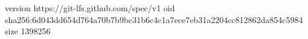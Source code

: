 version https://git-lfs.github.com/spec/v1
oid sha256:6d043dd654d764a70b7b9bc31b6c4c1a7ece7eb31a2204cc812862da854c5984
size 1398256
